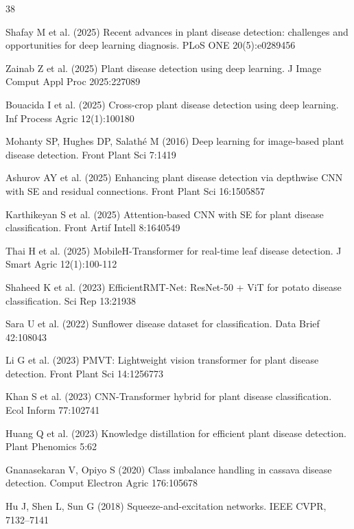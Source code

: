 \documentclass[default, iicol]{sn-jnl}
\theoremstyle{thmstyleone}%
\theoremstyle{thmstyletwo}%
\theoremstyle{thmstylethree}%
\begin{document}
\begin{thebibliography}{38}

Shafay M et al. (2025) Recent advances in plant disease detection: challenges and opportunities for deep learning diagnosis. PLoS ONE 20(5):e0289456

Zainab Z et al. (2025) Plant disease detection using deep learning. J Image Comput Appl Proc 2025:227089

Bouacida I et al. (2025) Cross-crop plant disease detection using deep learning. Inf Process Agric 12(1):100180

Mohanty SP, Hughes DP, Salathé M (2016) Deep learning for image-based plant disease detection. Front Plant Sci 7:1419

Ashurov AY et al. (2025) Enhancing plant disease detection via depthwise CNN with SE and residual connections. Front Plant Sci 16:1505857

Karthikeyan S et al. (2025) Attention-based CNN with SE for plant disease classification. Front Artif Intell 8:1640549

Thai H et al. (2025) MobileH-Transformer for real-time leaf disease detection. J Smart Agric 12(1):100-112

Shaheed K et al. (2023) EfficientRMT-Net: ResNet-50 + ViT for potato disease classification. Sci Rep 13:21938

Sara U et al. (2022) Sunflower disease dataset for classification. Data Brief 42:108043

Li G et al. (2023) PMVT: Lightweight vision transformer for plant disease detection. Front Plant Sci 14:1256773

Khan S et al. (2023) CNN-Transformer hybrid for plant disease classification. Ecol Inform 77:102741

Huang Q et al. (2023) Knowledge distillation for efficient plant disease detection. Plant Phenomics 5:62

Gnanasekaran V, Opiyo S (2020) Class imbalance handling in cassava disease detection. Comput Electron Agric 176:105678

Hu J, Shen L, Sun G (2018) Squeeze-and-excitation networks. IEEE CVPR, 7132–7141


\end{thebibliography}
\end{document}
